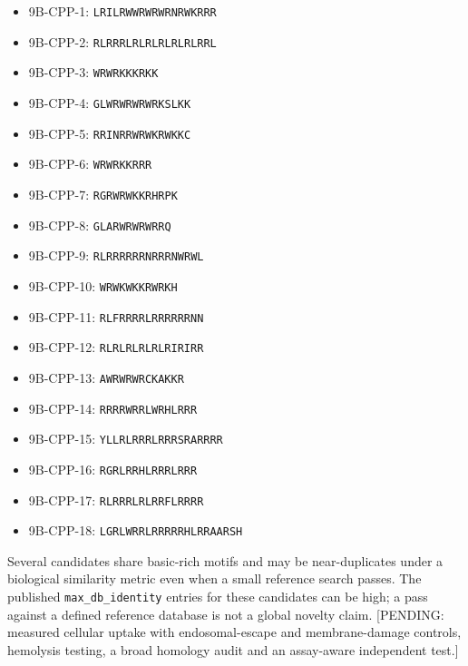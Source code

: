 \begin{itemize}
\tightlist
\item
  9B-CPP-1: \texttt{LRILRWWRWRWRNRWKRRR}
\item
  9B-CPP-2: \texttt{RLRRRLRLRLRLRLRLRRL}
\item
  9B-CPP-3: \texttt{WRWRKKKRKK}
\item
  9B-CPP-4: \texttt{GLWRWRWRWRKSLKK}
\item
  9B-CPP-5: \texttt{RRINRRWRWKRWKKC}
\item
  9B-CPP-6: \texttt{WRWRKKRRR}
\item
  9B-CPP-7: \texttt{RGRWRWKKRHRPK}
\item
  9B-CPP-8: \texttt{GLARWRWRWRRQ}
\item
  9B-CPP-9: \texttt{RLRRRRRRNRRRNWRWL}
\item
  9B-CPP-10: \texttt{WRWKWKKRWRKH}
\item
  9B-CPP-11: \texttt{RLFRRRRLRRRRRRNN}
\item
  9B-CPP-12: \texttt{RLRLRLRLRLRIRIRR}
\item
  9B-CPP-13: \texttt{AWRWRWRCKAKKR}
\item
  9B-CPP-14: \texttt{RRRRWRRLWRHLRRR}
\item
  9B-CPP-15: \texttt{YLLRLRRRLRRRSRARRRR}
\item
  9B-CPP-16: \texttt{RGRLRRHLRRRLRRR}
\item
  9B-CPP-17: \texttt{RLRRRLRLRRFLRRRR}
\item
  9B-CPP-18: \texttt{LGRLWRRLRRRRRHLRRAARSH}
\end{itemize}

Several candidates share basic-rich motifs and may be near-duplicates under a biological similarity metric even when a small reference search passes. The published \texttt{max\_db\_identity} entries for these candidates can be high; a pass against a defined reference database is not a global novelty claim. {[}PENDING: measured cellular uptake with endosomal-escape and membrane-damage controls, hemolysis testing, a broad homology audit and an assay-aware independent test.{]}


